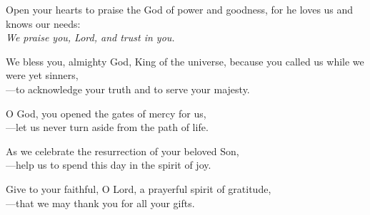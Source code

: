 \intercessions

\begin{raggedright}
Open your hearts to praise the God of power and goodness, for he loves us and knows our needs:\\
\emph{We praise you, Lord, and trust in you.}

\medskip
We bless you, almighty God, King of the universe, because you called us while we were yet sinners,\\
{\color{red}---}to acknowledge your truth and to serve your majesty.

\medskip
O God, you opened the gates of mercy for us,\\
{\color{red}---}let us never turn aside from the path of life.

\medskip
As we celebrate the resurrection of your beloved Son,\\
{\color{red}---}help us to spend this day in the spirit of joy.

\medskip
Give to your faithful, O Lord, a prayerful spirit of gratitude,\\
{\color{red}---}that we may thank you for all your gifts.
\end{raggedright}